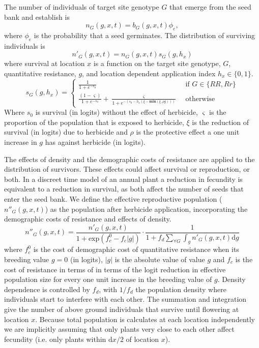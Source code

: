 \documentclass[10pt,letterpaper]{article}
\begin{document}
The number of individuals of target site genotype $G$ that emerge from the seed bank and establish is 
\begin{equation}\label{eq:above_ground}
	n_G(g, x, t) = b_G(g, x, t)\phi_e,
\end{equation}
where $\phi_e$ is the probability that a seed germinates. The distribution of surviving individuals is 
\begin{equation}\label{eq:abg_sur}
	n'_G(g, x, t) = n_G(g, x, t)s_G(g, h_x) 
\end{equation}
where survival at location $x$ is a function on the target site genotype, $G$, quantitative resistance, $g$, and location dependent application index $h_x \in \{0, 1\}$.   
\begin{equation}\label{eq:sur_G}
	s_G(g, h_x) = \begin{cases} 
		\frac{1}{1 + e^{-s_0}} &\text{~if~} G \in \{RR, Rr\} \\
		\frac{(1 - \varsigma)}{1 + e^{-s_0}} + \frac{\varsigma}{1 + e^{-\left(s_0 - h_x\left(\xi - \textbf{min}(\xi, \rho g) \right)\right)}} &\text{~otherwise~} 		
	\end{cases} 
\end{equation}  
Where $s_0$ is survival (in logits) without the effect of herbicide, $\varsigma$ is the proportion of the population that is exposed to herbicide, $\xi$ is the reduction of survival (in logits) due to herbicide and $\rho$ is the protective effect a one unit increase in $g$ has against herbicide (in logits).   

The effects of density and the demographic costs of resistance are applied to the distribution of survivors. These effects could affect survival or reproduction, or both. In a discreet time model of an annual plant a reduction in fecundity is equivalent to a reduction in survival, as both affect the number of seeds that enter the seed bank. We define the effective reproductive population ($n''_G(g, x, t)$) as the population after herbicide application, incorporating the demographic costs of resistance and effects of density. 
\begin{equation}\label{eq:effect_pop}
	n''_G(g, x, t) = \frac{n'_G(g, x, t)}{1 + \text{exp}(f_c^0 - f_c|g|)}\cdot\frac{1}{1 + f_d\sum_{\forall G} \int_g n'_G(g, x, t)\text{d}g}
\end{equation} 
where $f_c^0$ is the cost of demographic cost of quantitative resistance when its breeding value $g = 0$ (in logits), $|g|$ is the absolute value of value $g$ and $f_c$ is the cost of resistance in terms of in terms of the logit reduction in effective population size for every one unit increase in the breeding value of $g$. Density dependence is controlled by $f_d$, with $1/f_d$ the population density where individuals start to interfere with each other. The summation and integration give the number of above ground individuals that survive until flowering at location $x$. Because total population is calculates at each location independently we are implicitly assuming that only plants very close to each other affect fecundity (i.e. only plants within $\text{d}x / 2$ of location $x$). 
\end{document}
